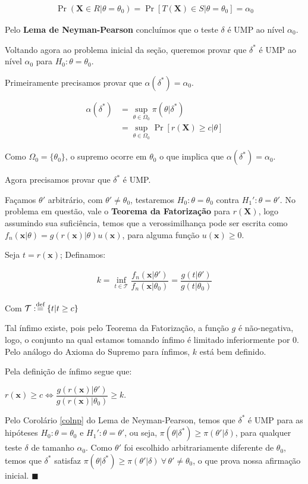 \documentclass[a4paper,10pt, notitlepage]{report}
\newcommand{\pow}{^}%
\newcommand{\pr}{\operatorname{Pr}} %
\newcommand{\bX}{\boldsymbol{X}} %
\newcommand{\bx}{\boldsymbol{x}} %
\newcommand{\defn}{\stackrel{\textrm{\scriptsize def}}{=}}
\begin{document}
	\begin{align*}
		\pr(\bX\in R|\theta=\theta_0)=\pr[T(\bX)\in S|\theta = \theta_0] = \alpha_0	
	\end{align*}
	
	Pelo \textbf{Lema de Neyman-Pearson} concluímos que o teste $\delta$ é UMP ao nível $\alpha_0$.
	
	
	Voltando agora ao problema inicial da seção, queremos provar que $\delta\pow*$ é UMP ao nível $\alpha_0$ para $H_0:\theta=\theta_0$.
	
	Primeiramente precisamos provar que $\alpha(\delta\pow*)=\alpha_0$.
	
	\begin{align*}
	\displaystyle\alpha(\delta\pow*)&=\sup_{\theta\in\Omega_0}\pi(\theta|\delta\pow*)\\
	&=\sup_{\theta\in\Omega_0}\pr[r(\bX)\geq c|\theta]
	\end{align*}
	
	Como $\Omega_0=\{\theta_0\}$, o supremo ocorre em $\theta_0$ o que implica que $\alpha(\delta\pow*)=\alpha_0$.
	
	Agora precisamos provar que $\delta\pow*$ é UMP.
	
	Façamos $\theta'$ arbitrário, com $\theta'\neq \theta_0$, testaremos $H_0:\theta=\theta_0$ contra $H_1':\theta=\theta'$.  No problema em questão, vale o \textbf{Teorema da Fatorização} para $r(\bX)$, logo assumindo sua suficiência, temos que a verossimilhança pode ser escrita como $f_n(\bx|\theta)=g(r(\bx)|\theta)u(\bx)$, para alguma função $u(\bx)\geq0$.
	
	Seja $t=r(\bx)$; Definamos:
	
	\begin{align*}
		k=\inf_{t\in\mathcal{T}}\dfrac{f_n(\bx|\theta')}{f_n(\bx|\theta_0)}=\dfrac{g(t|\theta')}{g(t|\theta_0)}
	\end{align*}
	
	Com $\mathcal{T}:\defn\{t|t\geq c\}$
	
	Tal ínfimo existe, pois pelo Teorema da Fatorização, a função $g$ é não-negativa, logo, o conjunto na qual estamos tomando ínfimo é limitado inferiormente por 0. Pelo análogo do Axioma do Supremo para ínfimos, $k$ está bem definido.
	
	Pela definição de ínfimo segue que:
	
	$r(\bx)\geq c\Leftrightarrow \dfrac{g(r(\bx)|\theta')}{g(r(\bx)|\theta_0)}\geq k$.
	
	Pelo Corolário \ref{colnp} do Lema de Neyman-Pearson, temos que $\delta\pow*$ é UMP para as hipóteses $H_0:\theta=\theta_0$ e $H_1':\theta=\theta'$, ou seja, $\pi(\theta|\delta\pow*)\geq\pi(\theta'|\delta)$, para qualquer teste $\delta$ de tamanho $\alpha_0$. Como $\theta'$ foi escolhido arbitrariamente diferente de $\theta_0$, temos que $\delta\pow*$ satisfaz $\pi(\theta|\delta\pow*)\geq\pi(\theta'|\delta)~\forall\,\theta'\neq\theta_0$, o que prova nossa afirmação inicial. $\blacksquare$
	
\end{document}
